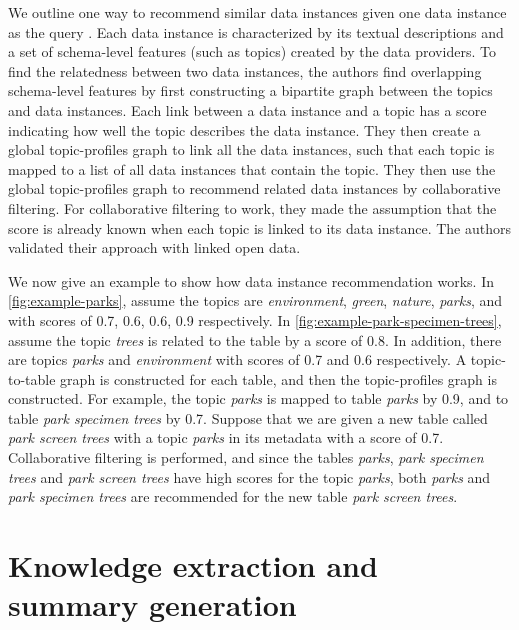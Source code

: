 We outline one way to recommend similar data instances given one data instance as the query \cite{conf/esws/EllefiBDT16}. Each data instance is characterized by its textual descriptions and a set of schema-level features (such as topics) created by the data providers. To find the relatedness between two data instances, the authors find overlapping schema-level features by first constructing a bipartite graph between the topics and data instances. Each link between a data instance and a topic has a score indicating how well the topic describes the data instance. They then create a global topic-profiles graph to link all the data instances, such that each topic is mapped to a list of all data instances that contain the topic. They then use the global topic-profiles graph to recommend related data instances by collaborative filtering. For collaborative filtering to work, they made the assumption that the score is already known when each topic is linked to its data instance. The authors validated their approach with linked open data.

We now give an example to show how data instance recommendation works. In \autoref{fig:example-parks}, assume the topics are \textit{environment}, \textit{green}, \textit{nature}, \textit{parks}, and with scores of 0.7, 0.6, 0.6, 0.9 respectively. In \autoref{fig:example-park-specimen-trees}, assume the topic \textit{trees} is related to the table by a score of 0.8. In addition, there are topics \textit{parks} and \textit{environment} with scores of 0.7 and 0.6 respectively. A topic-to-table graph is constructed for each table, and then the topic-profiles graph is constructed. For example, the topic \textit{parks} is mapped to table \textit{parks} by 0.9, and to table \textit{park specimen trees} by 0.7. Suppose that we are given a new table called \textit{park screen trees} with a topic \textit{parks} in its metadata with a score of 0.7. Collaborative filtering is performed, and since the tables \textit{parks}, \textit{park specimen trees} and \textit{park screen trees} have high scores for the topic \textit{parks}, both \textit{parks} and \textit{park specimen trees} are recommended for the new table \textit{park screen trees}.

\section{Knowledge extraction and summary generation}
\label{sec:KnowledgeExtractionAndSummaryGeneration}

